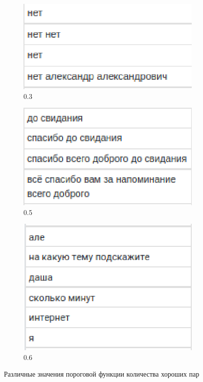 \documentclass[specification,annotation]{itmo-student-thesis}
\begin{document}
	 \begin{figure}[H]
		\begin{subfigure}[c]{0.3\textwidth}
			\includegraphics[width=\textwidth]{Sample_0.3.eps}
			\caption{0.3}
		\end{subfigure}
		\begin{subfigure}[c]{0.3\textwidth}
			\includegraphics[width=\textwidth]{Sample_0.5.eps}
			\caption{0.5}
		\end{subfigure}
		\begin{subfigure}[c]{0.3\textwidth}
			\includegraphics[width=\textwidth]{Sample_0.6.eps}
			\caption{0.6}
		\end{subfigure}
		\caption{Различные значения пороговой функции количества хороших пар}
		\label{ris:image1}
	\end{figure}
	
\end{document}
